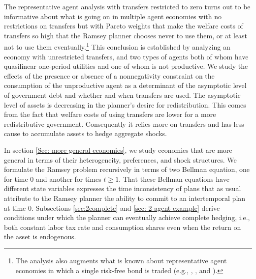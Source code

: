 \documentclass[thmsb,11pt]{article}
\begin{document}
 The representative agent analysis with transfers restricted to zero
  turns out to be   informative about what is going on in multiple agent economies with no restrictions on transfers but with Pareto weights that make
     the welfare  costs of transfers so  high that the Ramsey planner chooses never to use them, or at least not to use them
     eventually.\footnote{The analysis
also  augments what is known about representative agent economies in which a single  risk-free bond is traded (e.g., \citet{Aiyagari2002}, \citet{Farhi2010},
and \citet{Faraglia2011}).}
This conclusion is established by analyzing an economy with  unrestricted transfers, and two types of agents both of whom
 have quasilinear one-period utilities and one of whom is not productive. We study the effects of the presence or absence of  a nonnegativity constraint on the consumption of the unproductive agent as a determinant of the asymptotic level of government debt and  whether and when transfers are used.
The asymptotic level of assets is decreasing in the planner's desire for redistribution.
This comes from the fact that welfare costs of using transfers are lower for a more redistributive government.
Consequently it relies more on transfers and has less cause to accumulate assets to hedge aggregate shocks.



%
%
%

 In section \ref{Sec: more general economies},
we study economies that are more general in terms of their  heterogeneity, preferences, and shock structures.  We formulate the Ramsey problem recursively in terms of two Bellman equation,
one for time $0$ and another for times $t\geq 1$.  That these Bellman equations have different state variables expresses the time inconsistency
of  plans that  as usual attribute to the  Ramsey planner the ability to commit to an intertemporal plan at time $0$.
Subsections \ref{sec:2complete} and \ref{sec: 2 agent example}   derive conditions under which the planner can eventually
achieve complete hedging, i.e., both constant labor tax rate and consumption shares even when the return on the asset is endogenous.
\end{document}
